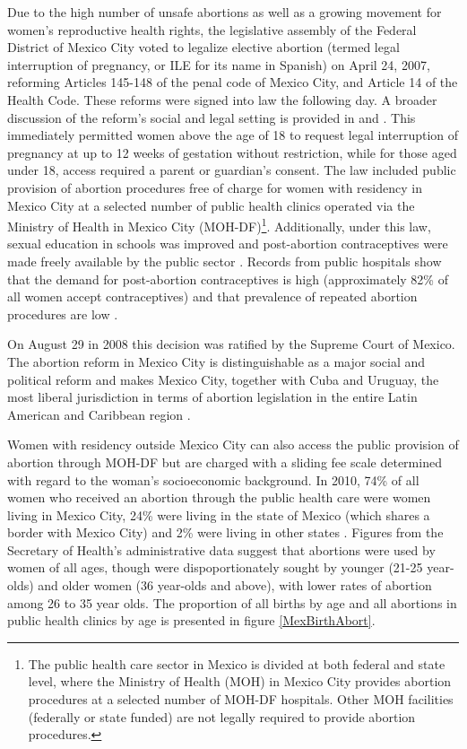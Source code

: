 \documentclass[a4paper, 11pt]{article}
\begin{document}
\begin{spacing}{2}
Due to the high number of unsafe abortions as well as a growing movement for women's reproductive health rights, the legislative assembly of the Federal District of Mexico City voted to legalize elective abortion (termed legal interruption of pregnancy, or ILE for its name in Spanish) on April 24, 2007, reforming Articles 145-148 of the penal code of Mexico City, and Article 14 of the Health Code.  These reforms were signed into law the following day.  A broader discussion of the reform's social and legal setting is provided in \citet{Kulczycki2011, Madrazo2009} and \citet{Johnson2013}.  This immediately permitted women above the age of 18 to request legal interruption of pregnancy at up to 12 weeks of gestation without restriction, while for those aged under 18, access required a parent or guardian's consent. The law included public provision of abortion procedures free of charge for women with residency in Mexico City at a selected number of public health clinics operated via the Ministry of Health in Mexico City (MOH-DF)\footnote{The public health care sector in Mexico is divided at both federal and state level, where the Ministry of Health (MOH) in Mexico City provides abortion procedures at a selected number of MOH-DF hospitals. Other MOH facilities (federally or state funded) are not legally required to provide abortion procedures.}.  Additionally, under this law, sexual education in schools was improved and post-abortion contraceptives were made freely available by the public sector \citep{Contreras2011}. Records from public hospitals show that the demand for post-abortion contraceptives is high (approximately 82\% of all women accept contraceptives) and that prevalence of repeated abortion procedures are low \citep{Becker}.

On August 29 in 2008 this decision was ratified by the Supreme Court of Mexico. The abortion reform in Mexico City is distinguishable as a major social and political reform and makes Mexico City, together with Cuba and Uruguay, the most liberal jurisdiction in terms of abortion legislation in the entire Latin American and Caribbean region \citep{Fraser}.

Women with residency outside Mexico City can also access the public provision of abortion through MOH-DF but are charged with a sliding fee scale determined with regard to the woman's socioeconomic background. In 2010, 74\% of all women who received an abortion through the public health care were women living in Mexico City, 24\% were living in the state of Mexico (which shares a border with Mexico City) and 2\% were living in other states \citep{Kalb}.  Figures from the Secretary of Health's administrative data suggest that abortions were used by women of all ages, though were dispoportionately sought by younger (21-25 year-olds) and older women (36 year-olds and above), with lower rates of abortion among 26 to 35 year olds.  The proportion of all births by age and all abortions in public health clinics by age is presented in figure \ref{MexBirthAbort}.


\end{spacing}
\end{document}
